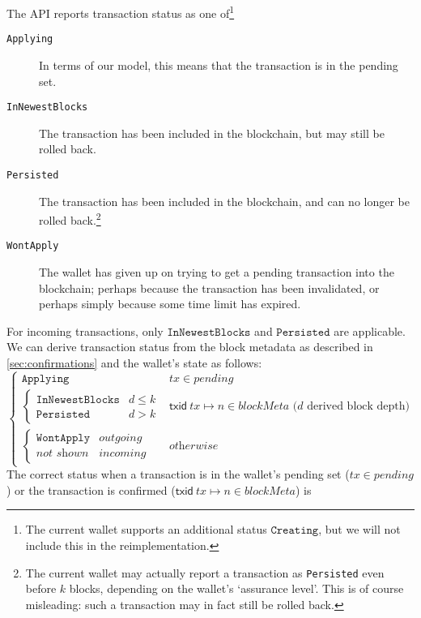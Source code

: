 \documentclass{article}
\theoremstyle{definition}{
  \newtheorem{lemma}{Lemma}[section] %
  \newtheorem{definition}[lemma]{Definition}
}
\theoremstyle{theorem}{
  \newtheorem{invariant}[lemma]{Invariant}
  \newtheorem{proofobligation}[lemma]{Proof Obligation}
}
\numberwithin{equation}{lemma}
\begin{document}
The API reports transaction status as one of\footnote{The current wallet
supports an additional status $\texttt{Creating}$, but we will not include this
in the reimplementation.}
%
\begin{description}
\item[\texttt{Applying}] In terms of our model, this means that the transaction
is in the pending set.
\item[\texttt{InNewestBlocks}] The transaction has been included in the blockchain,
but may still be rolled back.
\item[\texttt{Persisted}] The transaction has been included in the blockchain,
and can no longer be rolled back.\footnote{The current wallet may actually
report a transaction as \texttt{Persisted} even before $k$ blocks, depending on
the wallet's `assurance level'. This is of course misleading: such a transaction
may in fact still be rolled back.}
\item[\texttt{WontApply}] The wallet has given up on trying to get a pending
transaction into the blockchain; perhaps because the transaction has been
invalidated, or perhaps simply because some time limit has expired.
\end{description}
%
For incoming transactions, only $\mathtt{InNewestBlocks}$ and
$\mathtt{Persisted}$ are applicable. We can derive transaction status from
the block metadata as described in \cref{sec:confirmations} and
the wallet's state as follows:
%
\begin{equation*}
\begin{cases}
\texttt{Applying}       & \mathit{tx} \in \mathit{pending} \\
\begin{cases}
\texttt{InNewestBlocks} & d \le k \\
\texttt{Persisted}      & d > k
\end{cases} & \mathsf{txid} ~ \mathit{tx} \mapsto n \in \mathit{blockMeta} \text{ ($d$ derived block depth)} \\
\begin{cases}
\texttt{WontApply} & \textit{outgoing} \\
\textit{not shown} & \textit{incoming}
\end{cases} & \textit{otherwise}
\end{cases}
\end{equation*}
%
The correct status when a transaction is in the wallet's pending set
($\mathit{tx} \in \mathit{pending}$) or the transaction is confirmed
($\mathsf{txid} ~ \mathit{tx} \mapsto n \in \mathit{blockMeta}$) is
\end{document}
